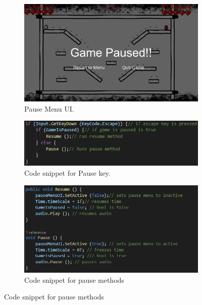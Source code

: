 \begin{figure}[h]
\begin{subfigure}{1\textwidth}
\centering
  \includegraphics[width= .4\linewidth]{Images/PauseMenu.PNG}
  \caption{Pause Menu UI.}
  \label{fig:PauseUI}
  \end{subfigure}
  \begin{subfigure}{1\textwidth}
\centering
  \includegraphics[width= 1\linewidth]{Images/PauseKey.PNG}
  \caption{Code snippet for Pause key.}
  \label{fig:escape}
  \end{subfigure}
  \newline
    \begin{subfigure}{1\textwidth}
\centering
  \includegraphics[width = 1\linewidth]{Images/Pause.PNG}
  \caption{Code snippet for pause methods}
  \label{fig:pause}
  \end{subfigure}
\end{figure}


